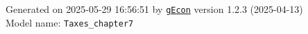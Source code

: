 \documentclass[10pt,a4paper]{article}
\numberwithin{equation}{section}
\begin{document}
\begin{flushleft}{\large
Generated  on 2025-05-29 16:56:51 by \href{http://gecon.r-forge.r-project.org/}{\texttt{gEcon}} version 1.2.3 (2025-04-13)\\
Model name: \verb+Taxes_chapter7+
}\end{flushleft}



\end{document}
